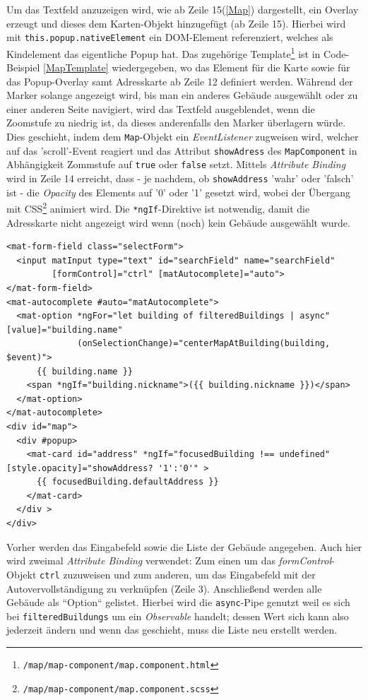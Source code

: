 Um das Textfeld anzuzeigen wird, wie ab Zeile 15(\ref{Map}) dargestellt, ein Overlay erzeugt und dieses dem Karten-Objekt hinzugefügt (ab Zeile 15). Hierbei wird mit \texttt{this.popup.nativeElement} ein \acs{DOM}-Element referenziert, welches als Kindelement das eigentliche Popup hat. Das zugehörige Template\footnote{\texttt{/map/map-component/map.component.html}} ist in Code-Beispiel \ref{MapTemplate} wiedergegeben, wo das Element für die Karte sowie für das Popup-Overlay samt Adresskarte ab Zeile 12 definiert werden. Während der Marker solange angezeigt wird, bis man ein anderes Gebäude ausgewählt oder zu einer anderen Seite navigiert, wird das Textfeld ausgeblendet, wenn die Zoomstufe zu niedrig ist, da dieses anderenfalls den Marker überlagern würde.  Dies geschieht,  indem dem \texttt{Map}-Objekt ein \textit{EventListener} zugweisen wird, welcher auf das 'scroll'-Event reagiert und das Attribut \texttt{showAdress} des \texttt{MapComponent} in Abhängigkeit Zommstufe auf \texttt{true} oder \texttt{false} setzt.  Mittels \textit{Attribute Binding} wird in Zeile 14 erreicht, dass - je nachdem, ob \texttt{showAddress} 'wahr' oder 'falsch' ist - die \textit{Opacity} des Elements auf '0' oder '1' gesetzt wird, wobei der Übergang mit \acs{CSS}\footnote{\texttt{/map/map-component/map.component.scss}} animiert wird. Die \texttt{*ngIf}-Direktive ist notwendig, damit die Adresskarte nicht angezeigt wird wenn (noch) kein Gebäude ausgewählt wurde.

\begin{lstlisting}[float, floatplacement=h, style=htmlcssjs, caption={Template des MapComponent}, label={MapTemplate}]
<mat-form-field class="selectForm">
  <input matInput type="text" id="searchField" name="searchField"
         [formControl]="ctrl" [matAutocomplete]="auto">
</mat-form-field>
<mat-autocomplete #auto="matAutocomplete">
  <mat-option *ngFor="let building of filteredBuildings | async" [value]="building.name"
              (onSelectionChange)="centerMapAtBuilding(building, $event)">
      {{ building.name }}
    <span *ngIf="building.nickname">({{ building.nickname }})</span>
  </mat-option>
</mat-autocomplete>
<div id="map">
  <div #popup>
    <mat-card id="address" *ngIf="focusedBuilding !== undefined" [style.opacity]="showAddress? '1':'0'" >
      {{ focusedBuilding.defaultAddress }}
    </mat-card>
  </div >
</div>
\end{lstlisting}

Vorher werden das Eingabefeld sowie die Liste der Gebäude angegeben. Auch hier wird zweimal \textit{Attribute Binding} verwendet: Zum einen um das \textit{formControl}-Objekt \texttt{ctrl} zuzuweisen und zum anderen, um das Eingabefeld mit der Autovervollständigung zu verknüpfen (Zeile 3). Anschließend werden alle Gebäude als ``Option`` gelistet. Hierbei wird die \texttt{async}-Pipe genutzt weil es sich bei \texttt{filteredBuildungs} um ein \textit{Observable} handelt; dessen Wert sich kann also jederzeit ändern und wenn das geschieht, muss die Liste neu erstellt werden.

